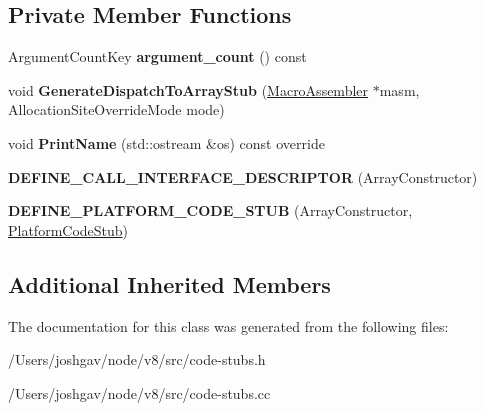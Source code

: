 \subsection*{Private Member Functions}
\begin{DoxyCompactItemize}
\item 
Argument\+Count\+Key {\bfseries argument\+\_\+count} () const \hypertarget{classv8_1_1internal_1_1_array_constructor_stub_aae6acf5e896fb1e67cc09f859d1dfaf4}{}\label{classv8_1_1internal_1_1_array_constructor_stub_aae6acf5e896fb1e67cc09f859d1dfaf4}

\item 
void {\bfseries Generate\+Dispatch\+To\+Array\+Stub} (\hyperlink{classv8_1_1internal_1_1_macro_assembler}{Macro\+Assembler} $\ast$masm, Allocation\+Site\+Override\+Mode mode)\hypertarget{classv8_1_1internal_1_1_array_constructor_stub_aa3d00b1356b3eb7620faf8d7da288add}{}\label{classv8_1_1internal_1_1_array_constructor_stub_aa3d00b1356b3eb7620faf8d7da288add}

\item 
void {\bfseries Print\+Name} (std\+::ostream \&os) const  override\hypertarget{classv8_1_1internal_1_1_array_constructor_stub_afc41034a6fe188d2ab677774455f4b43}{}\label{classv8_1_1internal_1_1_array_constructor_stub_afc41034a6fe188d2ab677774455f4b43}

\item 
{\bfseries D\+E\+F\+I\+N\+E\+\_\+\+C\+A\+L\+L\+\_\+\+I\+N\+T\+E\+R\+F\+A\+C\+E\+\_\+\+D\+E\+S\+C\+R\+I\+P\+T\+OR} (Array\+Constructor)\hypertarget{classv8_1_1internal_1_1_array_constructor_stub_a6e59efd6cda8789234fcfaa8345b12b0}{}\label{classv8_1_1internal_1_1_array_constructor_stub_a6e59efd6cda8789234fcfaa8345b12b0}

\item 
{\bfseries D\+E\+F\+I\+N\+E\+\_\+\+P\+L\+A\+T\+F\+O\+R\+M\+\_\+\+C\+O\+D\+E\+\_\+\+S\+T\+UB} (Array\+Constructor, \hyperlink{classv8_1_1internal_1_1_platform_code_stub}{Platform\+Code\+Stub})\hypertarget{classv8_1_1internal_1_1_array_constructor_stub_ad2cda5e69c793ccffa88cc8b77051c59}{}\label{classv8_1_1internal_1_1_array_constructor_stub_ad2cda5e69c793ccffa88cc8b77051c59}

\end{DoxyCompactItemize}
\subsection*{Additional Inherited Members}


The documentation for this class was generated from the following files\+:\begin{DoxyCompactItemize}
\item 
/\+Users/joshgav/node/v8/src/code-\/stubs.\+h\item 
/\+Users/joshgav/node/v8/src/code-\/stubs.\+cc\end{DoxyCompactItemize}
